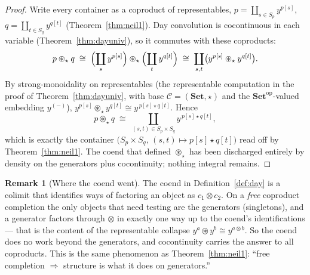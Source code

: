 \documentclass[11pt]{article}
\theoremstyle{plain}
\theoremstyle{definition}
\newtheorem{remark}[theorem]{Remark}
\newcommand{\Set}{\mathbf{Set}}
\newcommand{\op}{^{\mathrm{op}}}
\newcommand{\Day}{\circledast}
\newcommand{\iso}{\cong}
\begin{document}
\begin{proof}
Write every container as a coproduct of representables,
$p=\coprod_{s\in S_{p}}y^{p[s]}$, $q=\coprod_{t\in S_{q}}y^{q[t]}$
(Theorem~\ref{thm:neil1}). Day convolution is cocontinuous in each variable
(Theorem~\ref{thm:dayuniv}), so it commutes with these coproducts:
\[
  p\Day_{\star}q
  \;\iso\; \Bigl(\coprod_{s}y^{p[s]}\Bigr)\Day_{\star}\Bigl(\coprod_{t}y^{q[t]}\Bigr)
  \;\iso\; \coprod_{s,t}\bigl(y^{p[s]}\Day_{\star}y^{q[t]}\bigr).
\]
By strong-monoidality on representables (the representable computation in the
proof of Theorem~\ref{thm:dayuniv}, with base $\mathcal{C}=(\Set,\star)$ and the
$\Set\op$-valued embedding $y^{(-)}$),
$y^{p[s]}\Day_{\star}y^{q[t]}\iso y^{\,p[s]\star q[t]}$. Hence
\[
  p\Day_{\star}q \;\iso\; \coprod_{(s,t)\in S_{p}\times S_{q}} y^{\,p[s]\star q[t]},
\]
which is exactly the container $\bigl(S_{p}\times S_{q},\,(s,t)\mapsto p[s]\star
q[t]\bigr)$ read off by Theorem~\ref{thm:neil1}. The coend that defined
$\Day_{\star}$ has been discharged entirely by density on the generators plus
cocontinuity; nothing integral remains. \end{proof}

\begin{remark}[Where the coend went]
\label{rem:coendgone}
The coend in Definition~\ref{def:day} is a colimit that identifies ways of
factoring an object as $c_{1}\otimes c_{2}$. On a \emph{free} coproduct
completion the only objects that need testing are the generators (singletons),
and a generator factors through $\otimes$ in exactly one way up to the coend's
identifications --- that is the content of the representable collapse
$y^{a}\Day y^{b}\iso y^{a\otimes b}$. So the coend does no work beyond the
generators, and cocontinuity carries the answer to all coproducts. This is the
same phenomenon as Theorem~\ref{thm:neil1}: ``free completion $\Rightarrow$
structure is what it does on generators.''
\end{remark}
\end{document}
